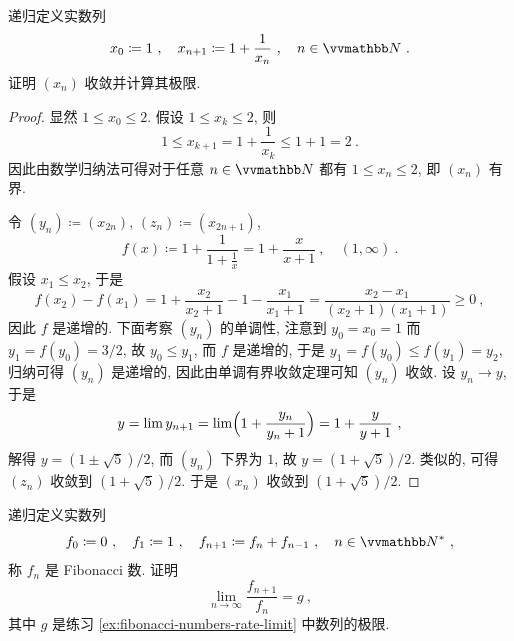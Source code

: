\begin{exercise}\label{ex:fibonacci-numbers-rate-limit}
    递归定义实数列
    \[
        x_0 \coloneqq 1\ ,\quad x_{n + 1} \coloneqq 1 + \frac{1}{x_n}\ ,\quad n \in \N\ .
    \]
    证明 \((x_n)\) 收敛并计算其极限.
\end{exercise}

\begin{proof}
    显然 \(1 \leq x_0 \leq 2\). 假设 \(1 \leq x_k \leq 2\), 则
    \[
        1 \leq x_{k + 1} = 1 + \frac{1}{x_k} \leq 1 + 1 = 2\ .
    \]
    因此由数学归纳法可得对于任意 \(n \in \N\) 都有 \(1 \leq x_n \leq 2\), 即 \((x_n)\) 有界.

    令 \((y_n) \coloneqq (x_{2 n})\), \((z_n) \coloneqq (x_{2 n + 1})\),
    \[
        f(x) \coloneqq 1 + \frac{1}{1 + \frac{1}{x}} = 1 + \frac{x}{x + 1}\ ,\quad (1, \infty)\ .
    \]
    假设 \(x_1 \leq x_2\), 于是
    \[
        f(x_2) - f(x_1) = 1 + \frac{x_2}{x_2 + 1} - 1 - \frac{x_1}{x_1 + 1} = \frac{x_2 - x_1}{(x_2 + 1) (x_1 + 1)} \geq 0\ ,
    \]
    因此 \(f\) 是递增的. 下面考察 \((y_n)\) 的单调性, 注意到 \(y_0 = x_0 = 1\) 而 \(y_1 = f(y_0) = 3 / 2\), 故 \(y_0 \leq y_1\), 而 \(f\) 是递增的, 于是 \(y_1 = f(y_0) \leq f(y_1) = y_2\), 归纳可得 \((y_n)\) 是递增的, 因此由单调有界收敛定理可知 \((y_n)\) 收敛. 设 \(y_n \to y\), 于是
    \[
        y = \lim y_{n + 1} = \lim \Bigl(1 + \frac{y_n}{y_n + 1}\Bigr) = 1 + \frac{y}{y + 1}\ ,
    \]
    解得 \(y = (1 \pm \sqrt{5}) / 2\), 而 \((y_n)\) 下界为 \(1\), 故 \(y = (1 + \sqrt{5}) / 2\). 类似的, 可得 \((z_n)\) 收敛到 \((1 + \sqrt{5}) / 2\). 于是 \((x_n)\) 收敛到 \((1 + \sqrt{5}) / 2\).
\end{proof}

\begin{exercise}\label{ex:fibonacci-sequence}
    递归定义实数列
    \[
        f_0 \coloneqq 0\ ,\quad f_1 \coloneqq 1\ ,\quad f_{n + 1} \coloneqq f_n + f_{n - 1}\ ,\quad n \in \N^\ast\ ,
    \]
    称 \(f_n\) 是 Fibonacci 数. 证明
    \[
        \lim_{n \to \infty} \frac{f_{n + 1}}{f_n} = g\ ,
    \]
    其中 \(g\) 是练习 \ref{ex:fibonacci-numbers-rate-limit} 中数列的极限.
\end{exercise}

